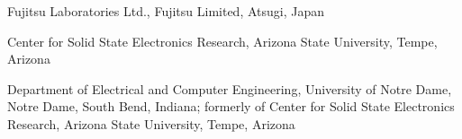 \documentclass[11pt]{book}
\begin{document}
\tableofcontents






 \begin{contributors}
  Fujitsu Laboratories Ltd., Fujitsu Limited, Atsugi, Japan

  Center for Solid State Electronics Research, Arizona State University, Tempe, Arizona

  Department of Electrical and Computer Engineering, University of Notre Dame, Notre Dame, South Bend, Indiana; formerly of
 Center for Solid State Electronics Research, Arizona
 State University, Tempe, Arizona 
 \end{contributors}


\begin{foreword}
\lipsum[1-2]
\end{foreword}


\begin{preface}
\lipsum[1-1]
\prefaceauthor{}
\end{preface}



\acknowledgments
\lipsum[1-2]
\end{document}
